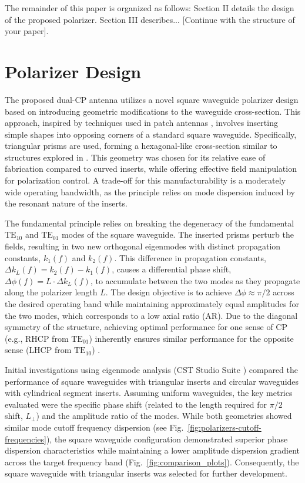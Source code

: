 \documentclass[lettersize,journal]{IEEEtran}
\newcommand{\TE}[2]{\text{TE}_{#1#2}}
\begin{document}
The remainder of this paper is organized as follows: Section II details the design of the proposed polarizer. Section III describes... [Continue with the structure of your paper].

\section{Polarizer Design}
\label{sec:polarizer_design}

The proposed dual-CP antenna utilizes a novel square waveguide polarizer design based on introducing geometric modifications to the waveguide cross-section. This approach, inspired by techniques used in patch antennas \cite{cite_patch_antenna}, involves inserting simple shapes into opposing corners of a standard square waveguide. Specifically, triangular prisms are used, forming a hexagonal-like cross-section similar to structures explored in \cite{bhardwaj-volakis:hexagonal-waveguides-new-class-of-waveguides-for-mmwave-circularly-polarized-horns}. This geometry was chosen for its relative ease of fabrication compared to curved inserts, while offering effective field manipulation for polarization control. A trade-off for this manufacturability is a moderately wide operating bandwidth, as the principle relies on mode dispersion induced by the resonant nature of the inserts.

The fundamental principle relies on breaking the degeneracy of the fundamental $\TE 10$ and $\TE 01$ modes of the square waveguide. The inserted prisms perturb the fields, resulting in two new orthogonal eigenmodes with distinct propagation constants, $k_1(f)$ and $k_2(f)$. This difference in propagation constants, $\Delta k_L(f) = k_2(f) - k_1(f)$, causes a differential phase shift, $\Delta\phi(f) = L \cdot \Delta k_L(f)$, to accumulate between the two modes as they propagate along the polarizer length $L$. The design objective is to achieve $\Delta\phi \approx \pi/2$ across the desired operating band while maintaining approximately equal amplitudes for the two modes, which corresponds to a low axial ratio (AR). Due to the diagonal symmetry of the structure, achieving optimal performance for one sense of CP (e.g., RHCP from $\TE 01$) inherently ensures similar performance for the opposite sense (LHCP from $\TE 10$) \cite{balanis:advanced-engineering-electromagnetics}.

Initial investigations using eigenmode analysis (CST Studio Suite \cite{cst}) compared the performance of square waveguides with triangular inserts and circular waveguides with cylindrical segment inserts. Assuming uniform waveguides, the key metrics evaluated were the specific phase shift (related to the length required for $\pi/2$ shift, $L_\perp$) and the amplitude ratio of the modes. While both geometries showed similar mode cutoff frequency dispersion (see Fig.~\ref{fig:polarizers-cutoff-frequencies}), the square waveguide configuration demonstrated superior phase dispersion characteristics while maintaining a lower amplitude dispersion gradient across the target frequency band (Fig.~\ref{fig:comparison_plots}). Consequently, the square waveguide with triangular inserts was selected for further development.
\end{document}

